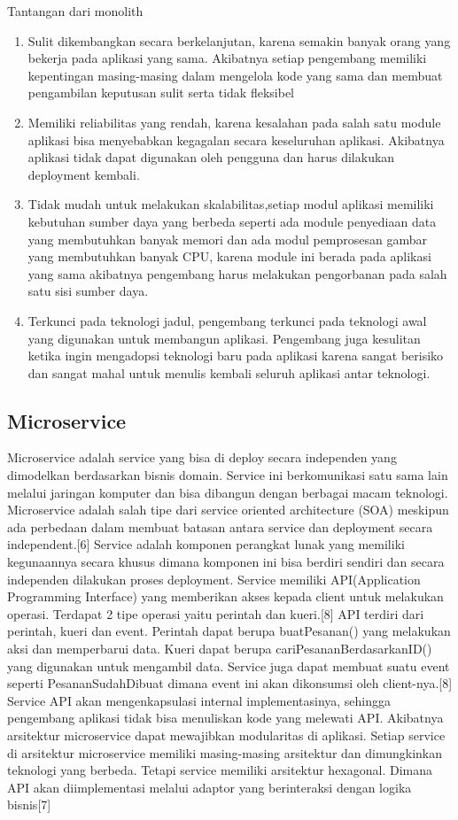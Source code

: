 Tantangan dari monolith	
\begin{enumerate}[leftmargin=1.3cm]
	\item Sulit dikembangkan secara berkelanjutan, karena semakin banyak orang yang bekerja pada aplikasi yang sama. Akibatnya setiap pengembang memiliki kepentingan masing-masing dalam mengelola kode yang sama dan membuat pengambilan keputusan sulit serta tidak fleksibel
	\item Memiliki reliabilitas yang rendah, karena kesalahan pada salah satu module aplikasi bisa menyebabkan kegagalan secara keseluruhan aplikasi. Akibatnya aplikasi tidak dapat digunakan oleh pengguna dan harus dilakukan deployment kembali.
	\item Tidak mudah untuk melakukan skalabilitas,setiap modul aplikasi memiliki kebutuhan sumber daya yang berbeda seperti ada module penyediaan data yang membutuhkan banyak memori dan ada modul pemprosesan gambar yang membutuhkan banyak CPU, karena module ini berada pada aplikasi yang sama akibatnya pengembang harus melakukan pengorbanan pada salah satu sisi sumber daya.
	\item Terkunci pada teknologi jadul, pengembang terkunci pada teknologi awal yang digunakan untuk membangun aplikasi. Pengembang juga kesulitan ketika ingin mengadopsi teknologi baru pada aplikasi karena sangat berisiko dan sangat mahal untuk menulis kembali seluruh aplikasi antar teknologi.\\
\end{enumerate}	

\subsection{Microservice}
Microservice adalah service yang bisa di deploy secara independen yang dimodelkan berdasarkan bisnis domain. Service ini berkomunikasi satu sama lain melalui jaringan komputer dan bisa dibangun dengan berbagai macam teknologi.  Microservice adalah salah tipe dari service oriented architecture (SOA) meskipun ada perbedaan dalam membuat batasan antara service dan deployment  secara independent.[6]
Service adalah komponen perangkat lunak yang memiliki kegunaannya secara khusus dimana komponen ini bisa berdiri sendiri dan secara independen dilakukan proses deployment. Service memiliki API(Application Programming Interface) yang memberikan akses kepada client untuk melakukan operasi. Terdapat 2 tipe operasi yaitu perintah dan kueri.[8]
API terdiri dari perintah, kueri dan event. Perintah dapat berupa buatPesanan() yang melakukan aksi dan memperbarui data. Kueri dapat berupa cariPesananBerdasarkanID() yang digunakan untuk mengambil data. Service juga dapat membuat suatu event seperti PesananSudahDibuat dimana event ini akan dikonsumsi oleh client-nya.[8]
Service API akan mengenkapsulasi internal implementasinya, sehingga pengembang aplikasi tidak bisa menuliskan kode yang melewati API. Akibatnya arsitektur microservice dapat mewajibkan modularitas di aplikasi.  Setiap service di arsitektur microservice memiliki masing-masing arsitektur dan dimungkinkan teknologi  yang berbeda. Tetapi service memiliki arsitektur hexagonal. Dimana API akan diimplementasi melalui adaptor yang berinteraksi dengan logika bisnis[7]

